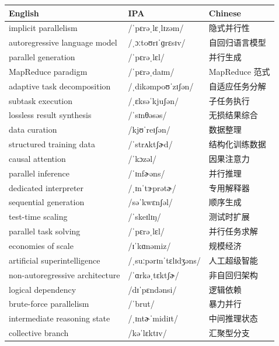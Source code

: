 \documentclass[UTF8,12pt,a4paper]{ctexart}
\providecommand{\zh}[1]{#1}
\begin{document}
\begin{tabular*}{\textwidth}{@{\extracolsep{\fill}}lll@{}}
\toprule
\textbf{English} & \textbf{IPA} & \textbf{Chinese} \\
\midrule
implicit parallelism & {\ipafont /ˈpɛrəˌlɛˌlɪzəm/} & \zh{隐式并行性} \\
autoregressive language model & {\ipafont /ˌɔːtoʊrɪˈɡrɛsɪv/} & \zh{自回归语言模型} \\
parallel generation & {\ipafont /ˈpɛrəˌlɛl/} & \zh{并行生成} \\
MapReduce paradigm & {\ipafont /ˈpɛrəˌdaɪm/} & \zh{MapReduce 范式} \\
adaptive task decomposition & {\ipafont /ˌdikəmpoʊˈzɪʃən/} & \zh{自适应任务分解} \\
subtask execution & {\ipafont /ˌɛksəˈkjuʃən/} & \zh{子任务执行} \\
lossless result synthesis & {\ipafont /ˈsɪnθəsəs/} & \zh{无损结果综合} \\
data curation & {\ipafont /kjʊˈreɪʃən/} & \zh{数据整理} \\
structured training data & {\ipafont /ˈstrʌktʃɚd/} & \zh{结构化训练数据} \\
causal attention & {\ipafont /ˈkɔzəl/} & \zh{因果注意力} \\
parallel inference & {\ipafont /ˈɪnfɚəns/} & \zh{并行推理} \\
dedicated interpreter & {\ipafont /ˌɪnˈtɝprətɚ/} & \zh{专用解释器} \\
sequential generation & {\ipafont /səˈkwɛnʃəl/} & \zh{顺序生成} \\
test-time scaling & {\ipafont /ˈskeɪlɪŋ/} & \zh{测试时扩展} \\
parallel task solving & {\ipafont /ˈpɛrəˌlɛl/} & \zh{并行任务求解} \\
economies of scale & {\ipafont /ɪˈkɑnəmiz/} & \zh{规模经济} \\
artificial superintelligence & {\ipafont /ˌsuːpərɪnˈtɛlɪdʒəns/} & \zh{人工超级智能} \\
non-autoregressive architecture & {\ipafont /ˈɑrkəˌtɛktʃɚ/} & \zh{非自回归架构} \\
logical dependency & {\ipafont /dɪˈpɛndənsi/} & \zh{逻辑依赖} \\
brute-force parallelism & {\ipafont /ˈbrut/} & \zh{暴力并行} \\
intermediate reasoning state & {\ipafont /ˌɪntɚˈmidiɪt/} & \zh{中间推理状态} \\
collective branch & {\ipafont /kəˈlɛktɪv/} & \zh{汇聚型分支} \\

\end{tabular*}
\end{document}
